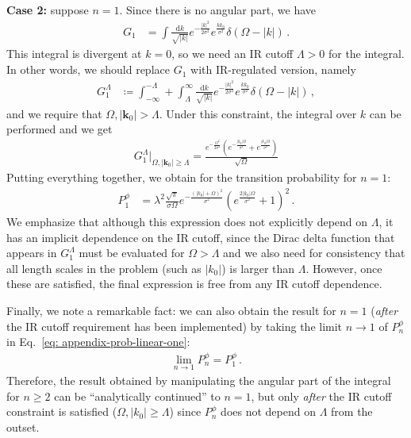 \documentclass[prd,twocolumn,superscriptaddress,nofootinbib,floatfix,amsmath,amssymb]{revtex4-2}
\newcommand{\bk}{{\bm{k}}}
\newcommand{\dd}{\textrm{d}}
\begin{document}
	\textbf{Case 2:} suppose $n=1$. Since there is no angular part, we have
	\begin{align}
	    G_1 &=  \int\frac{\dd k }{\sqrt{|k|}}e^{-\frac{|k|^2}{2\sigma^2}}e^{\frac{kk_0}{\sigma^2}}\delta(\Omega-|k|)\,.
	\end{align}
	This integral is divergent at $k=0$, so we need an IR cutoff $\Lambda>0$ for the integral. In other words, we should replace $G_1$ with IR-regulated version, namely 
	\begin{align}
	    G_1^\Lambda &\coloneqq  \int_{-\infty}^{-\Lambda}+\int_\Lambda^\infty\frac{\dd k }{\sqrt{|k|}}e^{-\frac{|k|^2}{2\sigma^2}}e^{\frac{kk_0}{\sigma^2}}\delta(\Omega-|k|)\,,
	\end{align}
	and we require that $\Omega,|\bk_0|>\Lambda$. Under this constraint, the integral over $k$ can be performed and we get
	\begin{align}
	    G^\Lambda_1\Bigr|_{\Omega,|\bk_0|\geq \Lambda} = \frac{e^{-\frac{\Omega ^2}{2 \sigma ^2}} \left(e^{-\frac{|k_0| \Omega }{\sigma ^2}}+e^{\frac{|k_0| \Omega }{\sigma ^2}}\right)}{\sqrt{\Omega }}
	\end{align}
	Putting everything together, we obtain for the transition probability for $n=1$:
    \begin{align}
        P^\phi_{1} &= 
	    \lambda^2\frac{\sqrt{\pi }}{\sigma  \Omega } e^{-\frac{(|k_0|+\Omega )^2}{\sigma ^2}} \left(e^{\frac{2 |k_0| \Omega }{\sigma ^2}}+1\right)^2\,.
    \end{align}
    We emphasize that although this expression does not explicitly depend on $\Lambda$, it has an implicit dependence on the IR cutoff, since the Dirac delta function that appears in $G_1^\Lambda$ must be evaluated for $\Omega >\Lambda$ and we also need for consistency that all length scales in the problem (such as $|k_0|$) is larger than $\Lambda$. However, once these are satisfied, the final expression is free from any IR cutoff dependence.
    
    {Finally, we note a remarkable fact: we can also obtain the result for $n=1$ (\textit{after} the IR cutoff requirement has been implemented) by taking the limit $n\to 1$ of $P^\phi_n$ in Eq.~\eqref{eq: appendix-prob-linear-one}:
	\begin{align}
	    \lim_{n\to 1} P^\phi_n = P^\phi_{1}\,.
	\end{align}
	Therefore, the result obtained by manipulating the angular part of the integral for $n\geq 2$ can be ``analytically continued'' to $n=1$, but only \textit{after} the IR cutoff constraint is satisfied ($\Omega,|k_0|\geq \Lambda$) since $P_n^\phi$ does not depend on $\Lambda$ from the outset.}
	
\end{document}
